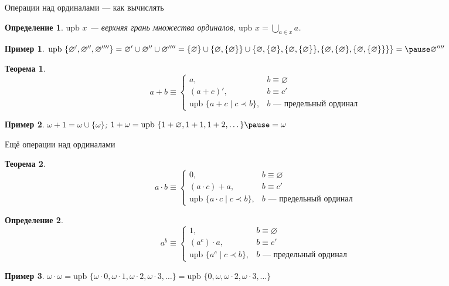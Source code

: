 \documentclass[aspectratio=169]{beamer}
\newtheorem{thm}{Теорема}[section]
\newtheorem{dfn}{Определение}[section]
\newtheorem{exm}{Пример}[section]
\begin{document}
\begin{frame}{Операции над ординалами --- как вычислять}
\begin{dfn}$\text{upb } x$ --- верхняя грань множества ординалов, $\text{upb }x = \bigcup_{a \in x} a$.\end{dfn} \pause
\begin{exm}$\text{upb } \{ \varnothing', \varnothing'', \varnothing'''' \} = \varnothing' \cup \varnothing'' \cup \varnothing'''' =
\{ \varnothing \} \cup \{ \varnothing, \{ \varnothing \} \} \cup \{ \varnothing, \{ \varnothing \}, \{ \varnothing, \{ \varnothing \} \}, \{ \varnothing, \{ \varnothing \}, \{ \varnothing, \{ \varnothing \} \} \} \}
= \pause \varnothing''''$\end{exm} \pause

\begin{thm}
$$a + b \equiv \left\{ \begin{array}{rl} 
   a, & b \equiv \varnothing\\
   (a + c)', & b \equiv c'\\
   \text{upb } \{ a+c \mid c \prec b \}, &\mbox{$b$ --- предельный ординал }\end{array}\right.$$\end{thm}

\begin{exm}$\omega + 1 = \omega \cup \{\omega\}$; \pause $1 + \omega = \text{upb }\{ 1+\varnothing, 1+1, 1+2, \dots \} \pause = \omega$\end{exm}
\end{frame}

\begin{frame}{Ещё операции над ординалами}
\begin{thm}
$$a \cdot b \equiv \left\{ \begin{array}{rl} 
   0, & b \equiv \varnothing\\
   (a \cdot c) + a, & b \equiv c'\\
   \text{upb } \{ a \cdot c \mid c \prec b \}, &\mbox{$b$ --- предельный ординал }\end{array}\right.$$
\end{thm}
\pause
\begin{dfn}
$$a ^ b \equiv \left\{ \begin{array}{rl} 
   1, & b \equiv \varnothing\\
   (a ^ c) \cdot a, & b \equiv c'\\
   \text{upb } \{ a^c \mid c \prec b \}, &\mbox{$b$ --- предельный ординал }\end{array}\right.$$
\end{dfn}
\pause
\begin{exm}$\omega \cdot \omega = \text{upb }\{\omega \cdot 0, \omega \cdot 1,\omega\cdot 2, \omega\cdot 3, \dots\} = \text{upb }\{0, \omega,\omega\cdot 2, \omega\cdot 3, \dots\}$\end{exm}
\end{frame}
\end{document}
